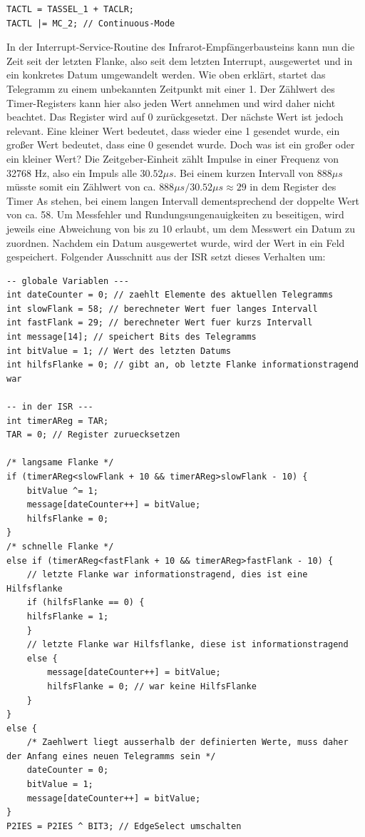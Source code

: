 \documentclass[12pt,a4paper,bibliography=totocnumbered,listof=totocnumbered]{scrartcl}
\begin{document}
\vspace{1em}
\begin{lstlisting}[caption=Konfiguration Timer A]
TACTL = TASSEL_1 + TACLR;
TACTL |= MC_2; // Continuous-Mode
\end{lstlisting}

In der Interrupt-Service-Routine des Infrarot-Empfängerbausteins kann nun die Zeit seit der letzten Flanke, also seit dem letzten Interrupt, ausgewertet und in ein konkretes Datum umgewandelt werden. Wie oben erklärt, startet das Telegramm zu einem unbekannten Zeitpunkt mit einer 1. Der Zählwert des Timer-Registers kann hier also jeden Wert annehmen und wird daher nicht beachtet. Das Register wird auf 0 zurückgesetzt. Der nächste Wert ist jedoch relevant. Eine kleiner Wert bedeutet, dass wieder eine 1 gesendet wurde, ein großer Wert bedeutet, dass eine 0 gesendet wurde. Doch was ist ein großer oder ein kleiner Wert? Die Zeitgeber-Einheit zählt Impulse in einer Frequenz von 32768 Hz, also ein Impuls alle \(30.52{\mu}s\). Bei einem kurzen Intervall von \(888{\mu}s\) müsste somit ein Zählwert von ca. \(888{\mu}s/30.52{\mu}s\approx29\) in dem Register des Timer As stehen, bei einem langen Intervall dementsprechend der doppelte Wert von ca. 58. Um Messfehler und Rundungsungenauigkeiten zu beseitigen, wird jeweils eine Abweichung von bis zu 10 erlaubt, um dem Messwert ein Datum zu zuordnen. Nachdem ein Datum ausgewertet wurde, wird der Wert in ein Feld gespeichert. Folgender Ausschnitt aus der ISR setzt dieses Verhalten um:

\vspace{1em}
\begin{lstlisting}[caption=Auswertung des Impulsintervalls]
-- globale Variablen ---
int dateCounter = 0; // zaehlt Elemente des aktuellen Telegramms
int slowFlank = 58; // berechneter Wert fuer langes Intervall
int fastFlank = 29; // berechneter Wert fuer kurzs Intervall
int message[14]; // speichert Bits des Telegramms
int bitValue = 1; // Wert des letzten Datums
int hilfsFlanke = 0; // gibt an, ob letzte Flanke informationstragend war

-- in der ISR --- 
int timerAReg = TAR;
TAR = 0; // Register zuruecksetzen

/* langsame Flanke */
if (timerAReg<slowFlank + 10 && timerAReg>slowFlank - 10) {
	bitValue ^= 1; 
	message[dateCounter++] = bitValue; 
	hilfsFlanke = 0; 
}
/* schnelle Flanke */
else if (timerAReg<fastFlank + 10 && timerAReg>fastFlank - 10) {
	// letzte Flanke war informationstragend, dies ist eine Hilfsflanke
	if (hilfsFlanke == 0) {
	hilfsFlanke = 1;
	}
	// letzte Flanke war Hilfsflanke, diese ist informationstragend
	else {
		message[dateCounter++] = bitValue;
		hilfsFlanke = 0; // war keine HilfsFlanke
	}
}
else {
	/* Zaehlwert liegt ausserhalb der definierten Werte, muss daher der Anfang eines neuen Telegramms sein */
	dateCounter = 0;
	bitValue = 1;
	message[dateCounter++] = bitValue;
}
P2IES = P2IES ^ BIT3; // EdgeSelect umschalten
\end{lstlisting}
\end{document}
